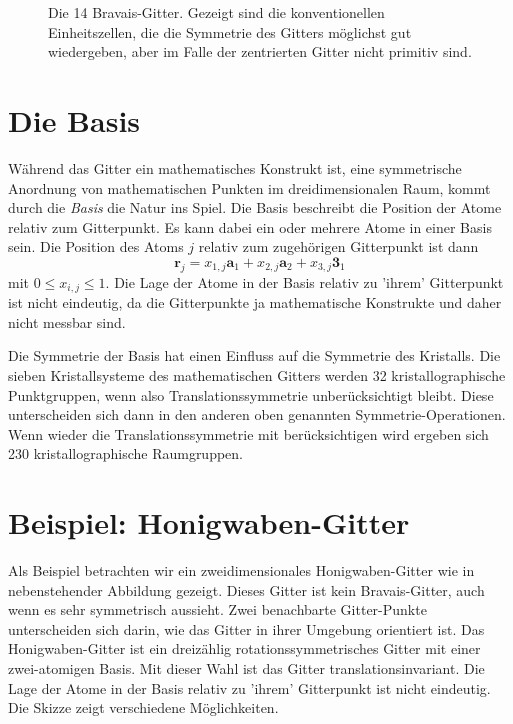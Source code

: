 \begin{figure}



\caption{Die 14 Bravais-Gitter. \label{fig:gitter_bravais14}  Gezeigt sind die konventionellen Einheitszellen, die die Symmetrie  des Gitters möglichst gut wiedergeben, aber im Falle der zentrierten Gitter nicht primitiv sind.
}
\end{figure}


\section{Die Basis}


Während das Gitter ein mathematisches Konstrukt ist, eine symmetrische Anordnung von mathematischen Punkten im dreidimensionalen Raum, kommt durch die \emph{Basis} die Natur ins Spiel. Die Basis beschreibt die Position der Atome relativ zum Gitterpunkt. Es kann dabei ein oder mehrere Atome in einer Basis sein. Die Position des Atoms $j$ relativ zum zugehörigen Gitterpunkt ist dann 
\begin{equation}
 \mathbf{r}_j = x_{1,j} \mathbf{a}_1 + x_{2,j} \mathbf{a}_2 + x_{3,j} \mathbf{3}_1  
\end{equation}
mit $0 \le x_{i,j} \le 1$. Die Lage der Atome in der Basis relativ zu 'ihrem' Gitterpunkt ist nicht eindeutig, da die Gitterpunkte ja mathematische Konstrukte und daher nicht messbar sind.


Die Symmetrie der Basis hat einen Einfluss auf die Symmetrie des Kristalls. Die sieben Kristallsysteme des mathematischen Gitters werden 32 kristallographische Punktgruppen, wenn also Translationssymmetrie unberücksichtigt bleibt. Diese unterscheiden sich dann in den anderen oben genannten Symmetrie-Operationen.
Wenn wieder die Translationssymmetrie mit berücksichtigen wird ergeben sich 230 kristallographische Raumgruppen.


\section{Beispiel: Honigwaben-Gitter}

Als Beispiel betrachten wir ein zweidimensionales Honigwaben-Gitter wie in nebenstehender Abbildung gezeigt. Dieses Gitter ist kein Bravais-Gitter, auch wenn es sehr symmetrisch aussieht. Zwei benachbarte Gitter-Punkte unterscheiden sich darin, wie das Gitter in ihrer Umgebung orientiert ist. Das  Honigwaben-Gitter ist ein dreizählig rotationssymmetrisches Gitter mit einer zwei-atomigen Basis. Mit dieser Wahl ist das Gitter translationsinvariant. Die Lage der Atome in der Basis relativ zu 'ihrem' Gitterpunkt ist nicht eindeutig. Die Skizze zeigt verschiedene Möglichkeiten.



